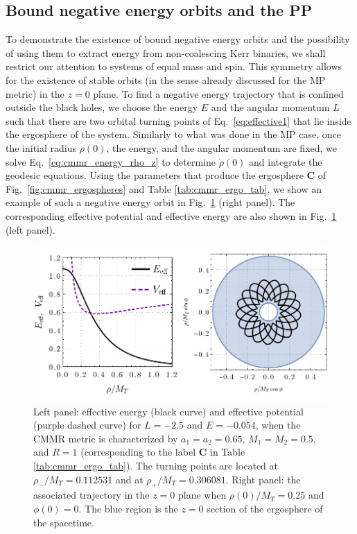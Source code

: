\subsection{Bound negative energy orbits and the PP}

To demonstrate the existence of bound negative energy orbits and the possibility of using them to extract energy from non-coalescing Kerr binaries, we shall restrict our attention to systems of equal mass and spin. This symmetry allows for the existence of stable orbits (in the sense already discussed for the MP metric) in the $z=0$ plane. To find a negative energy trajectory that is confined outside the black holes, we choose the energy $E$ and the angular momentum $L$ such that there are two orbital turning points of Eq.~\eqref{eq:effective1} that lie inside the ergosphere of the system. Similarly to what was done in the MP case, once the initial radius $\rho(0)$, the energy, and the angular momentum are fixed, we solve Eq.~\eqref{eq:cmmr_energy_rho_z} to determine $\dot{\rho}(0)$ and integrate the geodesic equations. Using the parameters that produce the ergosphere \textbf{C} of Fig.~\ref{fig:cmmr_ergospheres} and Table \ref{tab:cmmr_ergo_tab}, we show an example of such a negative energy orbit in Fig.~\ref{fig:cmmr_veff} (right panel). The corresponding effective potential and effective energy are also shown in Fig.~\ref{fig:cmmr_veff} (left panel).

\begin{figure}[!ht]
  \centering
  \includegraphics[width=\linewidth]{img/penrose_binaries/fig13.pdf}
  \caption{Left panel: effective energy (black curve) and effective potential (purple dashed curve) for $L=-2.5$ and $E=-0.054$, when the CMMR metric is characterized by $a_1=a_2=0.65$, $M_1 = M_2 = 0.5$, and $R = 1$ (corresponding to the label \textbf{C} in Table \ref{tab:cmmr_ergo_tab}). The turning points are located at $\rho_{-}/M_T = 0.112531$ and at $\rho_{+}/M_T = 0.306081$. Right panel: the associated trajectory in the $z = 0$ plane when $\rho(0)/M_T=0.25$ and $\phi(0)=0$. The blue region is the $z=0$ section of the ergosphere of the spacetime.}
  \label{fig:cmmr_veff}
\end{figure}

